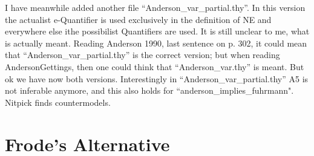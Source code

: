 \documentclass{birkjour}
\theoremstyle{definition}
\theoremstyle{remark}
\numberwithin{equation}{section}
\begin{document}
I have meanwhile added another file ``Anderson\_var\_partial.thy''. In this version the actualist e-Quantifier is used exclusively in the definition of NE and everywhere else ithe possibilist Quantifiers are used. It is still unclear to me, what is actually meant. Reading Anderson 1990, last sentence on p. 302, it could mean that ``Anderson\_var\_partial.thy'' is the correct version; but when reading AndersonGettings, then one could think that ``Anderson\_var.thy'' is meant. But ok we have now both versions. Interestingly in ``Anderson\_var\_partial.thy'' A5 is not inferable anymore, and this also holds for ``anderson\_implies\_fuhrmann". Nitpick finds countermodels.


\clearpage

\section{Frode's Alternative}
\end{document}
